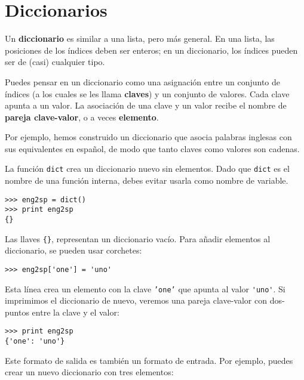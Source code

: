 
\chapter{Diccionarios}

Un {\bf diccionario} es similar a una lista, pero más general. En una lista,
las posiciones de los índices deben ser enteros; en un diccionario,
los índices pueden ser de (casi) cualquier tipo.

Puedes pensar en un diccionario como una asignación entre un conjunto de índices
(a los cuales se les llama {\bf claves}) y un conjunto de valores. Cada clave apunta a un
valor. La asociación de una clave y un valor recibe el nombre de {\bf
pareja clave-valor}, o a veces {\bf elemento}.

Por ejemplo, hemos construido un diccionario que asocia palabras inglesas con
sus equivalentes en español, de modo que tanto claves como valores son cadenas.

La función {\tt dict} crea un diccionario nuevo sin elementos.
Dado que {\tt dict} es el nombre de una función interna, debes
evitar usarla como nombre de variable.


\beforeverb
\begin{verbatim}
>>> eng2sp = dict()
>>> print eng2sp
{}
\end{verbatim}
\afterverb

Las llaves \verb"{}", representan un diccionario vacío.
Para añadir elementos al diccionario, se pueden usar corchetes:


\beforeverb
\begin{verbatim}
>>> eng2sp['one'] = 'uno'
\end{verbatim}
\afterverb
%
Esta línea crea un elemento con la clave {\tt 'one'}
que apunta al valor \verb"'uno'". Si imprimimos el
diccionario de nuevo, veremos una pareja clave-valor con dos-puntos
entre la clave y el valor:

\beforeverb
\begin{verbatim}
>>> print eng2sp
{'one': 'uno'}
\end{verbatim}
\afterverb
%
Este formato de salida es también un formato de entrada. Por ejemplo,
puedes crear un nuevo diccionario con tres elementos:

